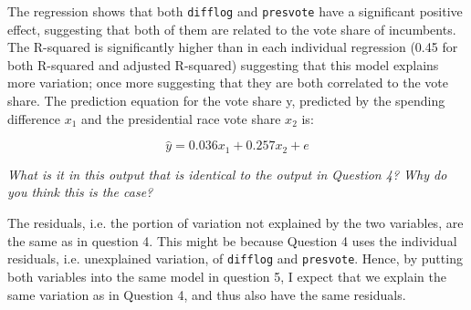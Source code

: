 \documentclass[12pt,a4paper]{article}
\begin{document}


The regression shows that both \texttt{difflog} and \texttt{presvote} have a significant positive effect, suggesting that both of them are related to the vote share of incumbents. The R-squared is significantly higher than in each individual regression (0.45 for both R-squared and adjusted R-squared) suggesting that this model explains more variation; once more suggesting that they are both correlated to the vote share. The prediction equation for the vote share y, predicted by the spending difference $x_{1}$ and the presidential race vote share $x_{2}$ is:

\[\hat{y} = 0.036x_{1} + 0.257x_{2} + e\]

\textit{What is it in this output that is identical to the output in Question 4? Why do you think this is the case?}

The residuals, i.e. the portion of variation not explained by the two variables, are the same as in question 4. This might be because Question 4 uses the individual residuals, i.e. unexplained variation, of \texttt{difflog} and \texttt{presvote}. Hence, by putting both variables into the same model in question 5, I expect that we explain the same variation as in Question 4, and thus also have the same residuals.
\end{document}
